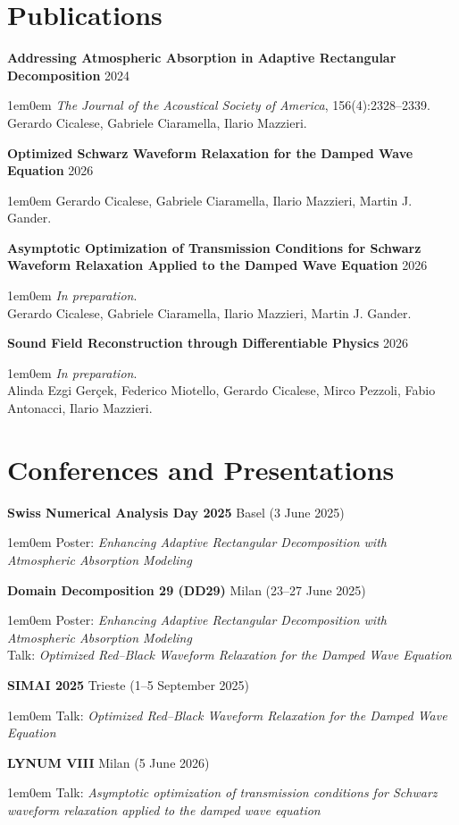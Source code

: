 \documentclass[11pt,a4paper]{article}
\newcommand{\cvdetail}[1]{%
  \begin{adjustwidth}{1em}{0em}
    #1
  \end{adjustwidth}%
  \vspace{0.5em}%
}
\newcommand{\cvsubitem}[2]{%
  \vspace{0.3em}%
  \noindent\textbf{#1} \hfill #2%
  \vspace{0.2em}%
}
\begin{document}
\section{Publications}

\cvsubitem{Addressing Atmospheric Absorption in Adaptive Rectangular Decomposition}{2024}
\cvdetail{\textit{The Journal of the Acoustical Society of America}, 156(4):2328--2339.\\Gerardo Cicalese, Gabriele Ciaramella, Ilario Mazzieri.}

\cvsubitem{Optimized Schwarz Waveform Relaxation for the Damped Wave Equation}{2026}
\cvdetail{Gerardo Cicalese, Gabriele Ciaramella, Ilario Mazzieri, Martin J. Gander.}

\newpage

\cvsubitem{Asymptotic Optimization of Transmission Conditions for Schwarz Waveform Relaxation Applied to the Damped Wave Equation}{2026}
\cvdetail{\textit{In preparation}.\\Gerardo Cicalese, Gabriele Ciaramella, Ilario Mazzieri, Martin J. Gander.}

\cvsubitem{Sound Field Reconstruction through Differentiable Physics}{2026}
\cvdetail{\textit{In preparation}.\\Alinda Ezgi Gerçek, Federico Miotello, Gerardo Cicalese, Mirco Pezzoli, Fabio Antonacci, Ilario Mazzieri.}

\section{Conferences and Presentations}

\cvsubitem{Swiss Numerical Analysis Day 2025}{Basel (3 June 2025)}
\cvdetail{Poster: \textit{Enhancing Adaptive Rectangular Decomposition with Atmospheric Absorption Modeling}}

\cvsubitem{Domain Decomposition 29 (DD29)}{Milan (23--27 June 2025)}
\cvdetail{Poster: \textit{Enhancing Adaptive Rectangular Decomposition with Atmospheric Absorption Modeling}\\Talk: \textit{Optimized Red--Black Waveform Relaxation for the Damped Wave Equation}}

\cvsubitem{SIMAI 2025}{Trieste (1--5 September 2025)}
\cvdetail{Talk: \textit{Optimized Red--Black Waveform Relaxation for the Damped Wave Equation}}

\cvsubitem{LYNUM VIII}{Milan (5 June 2026)}
\cvdetail{Talk: \textit{Asymptotic optimization of transmission conditions for Schwarz waveform relaxation applied to the damped wave equation}}
\end{document}
